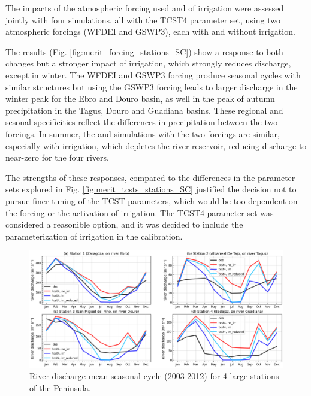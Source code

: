 The impacts of the atmospheric forcing used and of irrigation were assessed jointly with four simulations, all with the TCST4 parameter set, using two atmospheric forcings (WFDEI and GSWP3), %
each with and without irrigation. 

The results (Fig. \ref{fig:merit_forcing_stations_SC}) show a response to both changes but a stronger impact of irrigation, which strongly reduces discharge, except in winter. The WFDEI and GSWP3 forcing produce seasonal cycles with similar structures but using the GSWP3 forcing leads to larger discharge in the winter peak for the Ebro and Douro basin, as well in the peak of autumn precipitation in the Tagus, Douro and Guadiana basins. These regional and sesonal specificities reflect the differences in precipitation between the two forcings. %
In summer, the \noirr and \irr simulations with the two forcings are similar, especially with irrigation, which depletes the river reservoir, reducing discharge to near-zero for the four rivers.

The strengths of these responses, compared to the differences in the parameter sets explored in Fig. \ref{fig:merit_tcsts_stations_SC} justified the decision not to pursue finer tuning of the TCST parameters, which would be too dependent on the forcing or the activation of irrigation. The TCST4 parameter set was considered a reasonible option, and it was decided to include the parameterization of irrigation in the calibration. 

\begin{figure}[htbp]
    \centering
    \includegraphics[width=\textwidth]{images/chap3/river_discharge/merit_irr_4stations_SC.png}
    \caption{River discharge mean seasonal cycle (2003-2012) for 4 large stations of the Peninsula.}
    \label{fig:merit_irr_stations_SC}
\end{figure}

